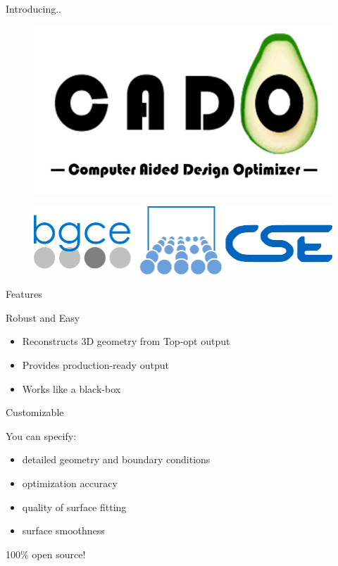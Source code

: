 \begin{frame}{Introducing..}
	\begin{figure}
	\centering
	\includegraphics[scale=0.2]{Pictures/FirstHalf/cado_logo_text.jpg}
	\end{figure}
	\begin{figure}
	\centering
	\includegraphics[scale=0.35]{Pictures/FirstHalf/sccs_os2.pdf}
	\end{figure}
\end{frame}

\begin{frame}{Features}
	\begin{block}{Robust and Easy}{
			\begin{itemize}
				\item Reconstructs 3D geometry from Top-opt output
				\item Provides production-ready output
				\item Works like a black-box
			\end{itemize}
		}
	\end{block}
	\begin{block}{Customizable}{
			You can specify:
			\begin{itemize}
				\item detailed geometry and boundary conditions
				\item optimization accuracy
				\item quality of surface fitting
				\item surface smoothness
			\end{itemize}
		}
	\end{block}
	\begin{block}{100\% open source!}{
		}
	\end{block}
\end{frame}

